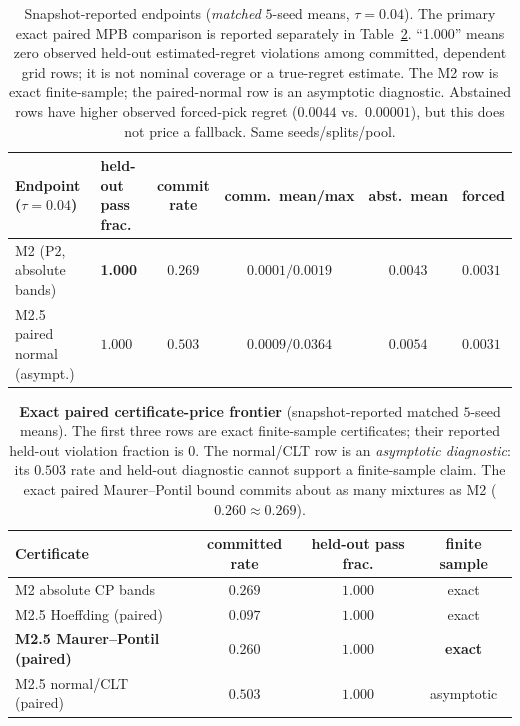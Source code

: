 \documentclass{article}
\begin{document}
\FloatBarrier
\begin{table}[H]
\centering\small\setlength{\tabcolsep}{3pt}
\begin{tabular}{llcccl}
\toprule
Endpoint ($\tau{=}0.04$) & held-out pass frac. & commit rate &
 comm.\ mean/max & abst.\ mean & forced \\
\midrule
M2 ($\mathrm{P2}$, absolute bands) &
 \textbf{1.000} & $0.269$ &
 $0.0001/0.0019$ & $0.0043$ & $0.0031$ \\
M2.5 paired normal (asympt.) &
 $1.000$ & $0.503$ &
 $0.0009/0.0364$ & $0.0054$ & $0.0031$ \\
\bottomrule
\end{tabular}
\caption{Snapshot-reported endpoints (\emph{matched} $5$-seed means, $\tau{=}0.04$).
The primary exact paired MPB comparison is reported separately in
Table~\ref{tab:frontier}. ``1.000'' means
zero observed held-out estimated-regret violations among committed, dependent grid rows; it is
not nominal coverage or a true-regret estimate. The M2 row is exact finite-sample; the
paired-normal row is an asymptotic diagnostic. Abstained rows have higher observed forced-pick regret
($0.0044$ vs.\ $0.00001$), but this does not price a fallback. Same seeds/splits/pool.}
\label{tab:main}
\end{table}

\begin{table}[H]
\centering\small
\begin{tabular}{lccc}
\toprule
Certificate & committed rate & held-out pass frac. & finite sample \\
\midrule
M2 absolute CP bands & $0.269$ & $1.000$ & exact \\
M2.5 Hoeffding (paired) & $0.097$ & $1.000$ & exact \\
\bfseries M2.5 Maurer--Pontil (paired) &
 \bfseries $0.260$ & \bfseries $1.000$ & \bfseries exact \\
M2.5 normal/CLT (paired) &
 $0.503$ & $1.000$ & asymptotic \\
\bottomrule
\end{tabular}
\caption{\textbf{Exact paired certificate-price frontier} (snapshot-reported matched $5$-seed means). The first three rows
are exact finite-sample certificates; their reported held-out violation fraction is $0$. The
normal/CLT row is an \emph{asymptotic diagnostic}: its $0.503$ rate and held-out diagnostic
cannot support a finite-sample claim. The exact paired Maurer--Pontil bound commits about as
many mixtures as M2 ($0.260\approx0.269$).}
\label{tab:frontier}
\end{table}
\end{document}

